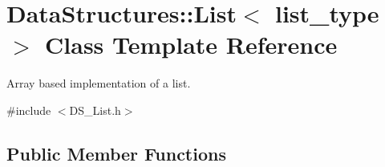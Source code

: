 \hypertarget{class_data_structures_1_1_list}{\section{Data\-Structures\-:\-:List$<$ list\-\_\-type $>$ Class Template Reference}
\label{class_data_structures_1_1_list}
}


Array based implementation of a list.  




{\ttfamily \#include $<$D\-S\-\_\-\-List.\-h$>$}

\subsection*{Public Member Functions}
